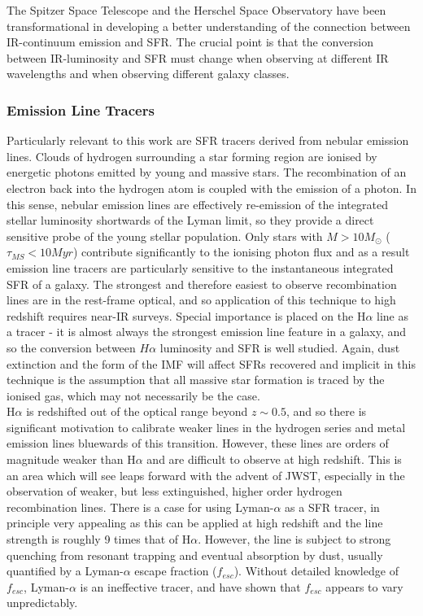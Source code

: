 \documentclass{literature}
\begin{document}
The Spitzer Space Telescope \citep{Werner2004} and the Herschel Space Observatory \citep{Pilbratt2010} have been transformational in developing a better understanding of the connection between IR-continuum emission and SFR. The crucial point is that the conversion between IR-luminosity and SFR must change when observing at different IR wavelengths and when observing different galaxy classes.   

\subsubsection{Emission Line Tracers}\label{subsubsec:em_lines}
Particularly relevant to this work are SFR tracers derived from nebular emission lines. Clouds of hydrogen surrounding a star forming region are ionised by energetic photons emitted by young and massive stars. The recombination of an electron back into the hydrogen atom is coupled with the emission of a photon. In this sense, nebular emission lines are effectively re-emission of the integrated stellar luminosity shortwards of the Lyman limit, so they provide a direct sensitive probe of the young stellar population. Only stars with $M > 10M_{\odot}$ ($\tau _{MS} < 10Myr$) contribute significantly to the ionising photon flux and as a result emission line tracers are particularly sensitive to the instantaneous integrated SFR of a galaxy. The strongest and therefore easiest to observe recombination lines are in the rest-frame optical, and so application of this technique to high redshift requires near-IR surveys. Special importance is placed on the H$\alpha$ line as a tracer - it is almost always the strongest emission line feature in a galaxy, and so the conversion between $H\alpha$ luminosity and SFR is well studied. Again, dust extinction and the form of the IMF will affect SFRs recovered and implicit in this technique is the assumption that all massive star formation is traced by the ionised gas, which may not necessarily be the case. \\ 

H$\alpha$ is redshifted out of the optical range beyond $z\sim 0.5$, and so there is significant motivation to calibrate weaker lines in the hydrogen series and metal emission lines bluewards of this transition. However, these lines are orders of magnitude weaker than H$\alpha$ and are difficult to observe at high redshift. This is an area which will see leaps forward with the advent of JWST, especially in the observation of weaker, but less extinguished, higher order hydrogen recombination lines. There is a case for using Lyman-$\alpha$ as a SFR tracer, in principle very appealing as this can be applied at high redshift and the line strength is roughly 9 times that of H$\alpha$. However, the line is subject to strong quenching from resonant trapping and eventual absorption by dust, usually quantified by a Lyman-$\alpha$ escape fraction ($f_{esc}$). Without detailed knowledge of $f_{esc}$, Lyman-$\alpha$ is an ineffective tracer, and \citep{Hayes2011} have shown that $f_{esc}$ appears to vary unpredictably.  
\end{document}
